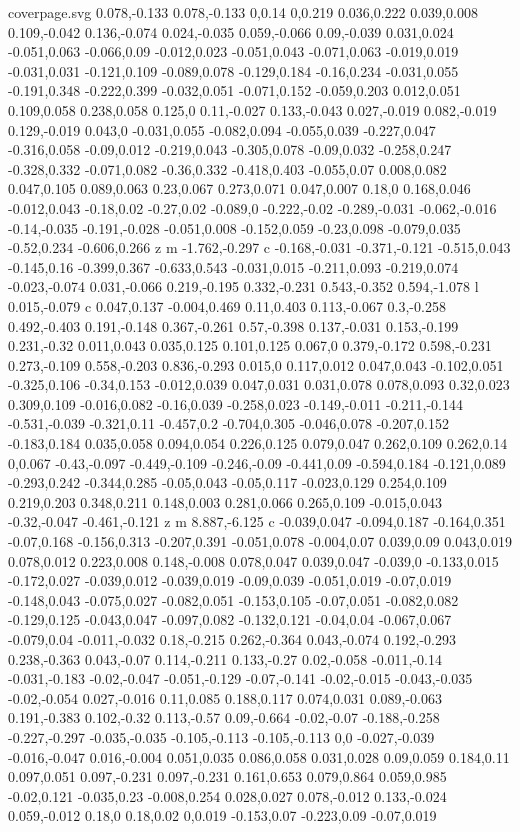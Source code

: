 \begin{filecontents}[noheader]{coverpage.svg}
0.078,-0.133 0.078,-0.133 0,0.14 0,0.219 0.036,0.222 0.039,0.008 0.109,-0.042 0.136,-0.074 0.024,-0.035 0.059,-0.066 0.09,-0.039 0.031,0.024 -0.051,0.063 -0.066,0.09 -0.012,0.023 -0.051,0.043 -0.071,0.063 -0.019,0.019 -0.031,0.031 -0.121,0.109 -0.089,0.078 -0.129,0.184 -0.16,0.234 -0.031,0.055 -0.191,0.348 -0.222,0.399 -0.032,0.051 -0.071,0.152 -0.059,0.203 0.012,0.051 0.109,0.058 0.238,0.058 0.125,0 0.11,-0.027 0.133,-0.043 0.027,-0.019 0.082,-0.019 0.129,-0.019 0.043,0 -0.031,0.055 -0.082,0.094 -0.055,0.039 -0.227,0.047 -0.316,0.058 -0.09,0.012 -0.219,0.043 -0.305,0.078 -0.09,0.032 -0.258,0.247 -0.328,0.332 -0.071,0.082 -0.36,0.332 -0.418,0.403 -0.055,0.07 0.008,0.082 0.047,0.105 0.089,0.063 0.23,0.067 0.273,0.071 0.047,0.007 0.18,0 0.168,0.046 -0.012,0.043 -0.18,0.02 -0.27,0.02 -0.089,0 -0.222,-0.02 -0.289,-0.031 -0.062,-0.016 -0.14,-0.035 -0.191,-0.028 -0.051,0.008 -0.152,0.059 -0.23,0.098 -0.079,0.035 -0.52,0.234 -0.606,0.266 z m -1.762,-0.297 c -0.168,-0.031 -0.371,-0.121 -0.515,0.043 -0.145,0.16 -0.399,0.367 -0.633,0.543 -0.031,0.015 -0.211,0.093 -0.219,0.074 -0.023,-0.074 0.031,-0.066 0.219,-0.195 0.332,-0.231 0.543,-0.352 0.594,-1.078 l 0.015,-0.079 c 0.047,0.137 -0.004,0.469 0.11,0.403 0.113,-0.067 0.3,-0.258 0.492,-0.403 0.191,-0.148 0.367,-0.261 0.57,-0.398 0.137,-0.031 0.153,-0.199 0.231,-0.32 0.011,0.043 0.035,0.125 0.101,0.125 0.067,0 0.379,-0.172 0.598,-0.231 0.273,-0.109 0.558,-0.203 0.836,-0.293 0.015,0 0.117,0.012 0.047,0.043 -0.102,0.051 -0.325,0.106 -0.34,0.153 -0.012,0.039 0.047,0.031 0.031,0.078 0.078,0.093 0.32,0.023 0.309,0.109 -0.016,0.082 -0.16,0.039 -0.258,0.023 -0.149,-0.011 -0.211,-0.144 -0.531,-0.039 -0.321,0.11 -0.457,0.2 -0.704,0.305 -0.046,0.078 -0.207,0.152 -0.183,0.184 0.035,0.058 0.094,0.054 0.226,0.125 0.079,0.047 0.262,0.109 0.262,0.14 0,0.067 -0.43,-0.097 -0.449,-0.109 -0.246,-0.09 -0.441,0.09 -0.594,0.184 -0.121,0.089 -0.293,0.242 -0.344,0.285 -0.05,0.043 -0.05,0.117 -0.023,0.129 0.254,0.109 0.219,0.203 0.348,0.211 0.148,0.003 0.281,0.066 0.265,0.109 -0.015,0.043 -0.32,-0.047 -0.461,-0.121 z m 8.887,-6.125 c -0.039,0.047 -0.094,0.187 -0.164,0.351 -0.07,0.168 -0.156,0.313 -0.207,0.391 -0.051,0.078 -0.004,0.07 0.039,0.09 0.043,0.019 0.078,0.012 0.223,0.008 0.148,-0.008 0.078,0.047 0.039,0.047 -0.039,0 -0.133,0.015 -0.172,0.027 -0.039,0.012 -0.039,0.019 -0.09,0.039 -0.051,0.019 -0.07,0.019 -0.148,0.043 -0.075,0.027 -0.082,0.051 -0.153,0.105 -0.07,0.051 -0.082,0.082 -0.129,0.125 -0.043,0.047 -0.097,0.082 -0.132,0.121 -0.04,0.04 -0.067,0.067 -0.079,0.04 -0.011,-0.032 0.18,-0.215 0.262,-0.364 0.043,-0.074 0.192,-0.293 0.238,-0.363 0.043,-0.07 0.114,-0.211 0.133,-0.27 0.02,-0.058 -0.011,-0.14 -0.031,-0.183 -0.02,-0.047 -0.051,-0.129 -0.07,-0.141 -0.02,-0.015 -0.043,-0.035 -0.02,-0.054 0.027,-0.016 0.11,0.085 0.188,0.117 0.074,0.031 0.089,-0.063 0.191,-0.383 0.102,-0.32 0.113,-0.57 0.09,-0.664 -0.02,-0.07 -0.188,-0.258 -0.227,-0.297 -0.035,-0.035 -0.105,-0.113 -0.105,-0.113 0,0 -0.027,-0.039 -0.016,-0.047 0.016,-0.004 0.051,0.035 0.086,0.058 0.031,0.028 0.09,0.059 0.184,0.11 0.097,0.051 0.097,-0.231 0.097,-0.231 0.161,0.653 0.079,0.864 0.059,0.985 -0.02,0.121 -0.035,0.23 -0.008,0.254 0.028,0.027 0.078,-0.012 0.133,-0.024 0.059,-0.012 0.18,0 0.18,0.02 0,0.019 -0.153,0.07 -0.223,0.09 -0.07,0.019 
\end{filecontents}

